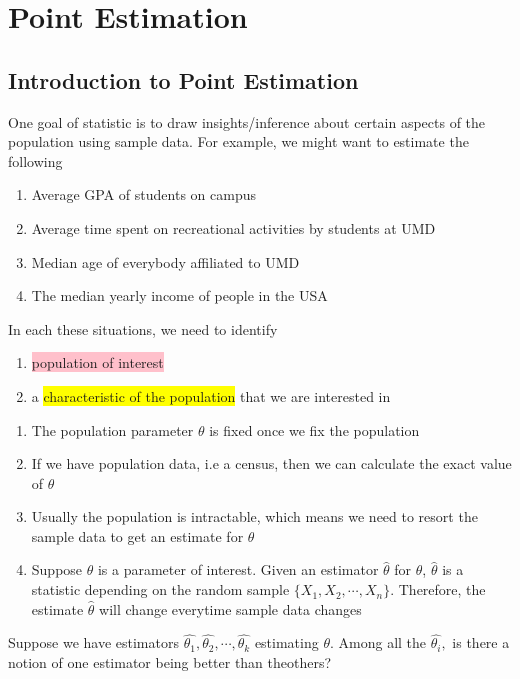 \chapter[Point Estimation]{Point Estimation}
\section[Introduction to Point Estimation]{Introduction to Point Estimation}
One goal of statistic is to draw insights/inference about certain aspects of the population using sample data. For example, we might want to estimate the following \begin{enumerate}
\item Average GPA of students on campus
\item Average time spent on recreational activities by students at UMD
\item Median age of everybody affiliated to UMD
\item The median yearly income of people in the USA
\end{enumerate}
In each these situations, we need to identify\begin{enumerate}
\item \colorbox{pink}{population of interest}
\item a \colorbox{yellow}{characteristic of the population} that we are interested in
\end{enumerate}

\note \begin{enumerate}
\item The population parameter $\theta$ is fixed once we fix the population
\item If we have population data, i.e a census, then we can calculate the exact value of $\theta$
\item Usually the population is intractable, which means we need to resort the sample data to get an estimate for $\theta$
\item Suppose $\theta$ is a parameter of interest. Given an estimator $\widehat{\theta}$ for $\theta$, $\widehat{\theta}$ is a statistic depending on the random sample $\{X_1,X_2,\cdots,X_n\}$. Therefore, the estimate $\widehat{\theta}$ will change everytime sample data changes
\end{enumerate}


\exercise Suppose we have estimators $\widehat{\theta_1},\widehat{\theta_2},\cdots,\widehat{\theta_k}$ estimating $\theta$. Among all the $\widehat{\theta_i},$ is there a notion of one estimator being better than theothers?
